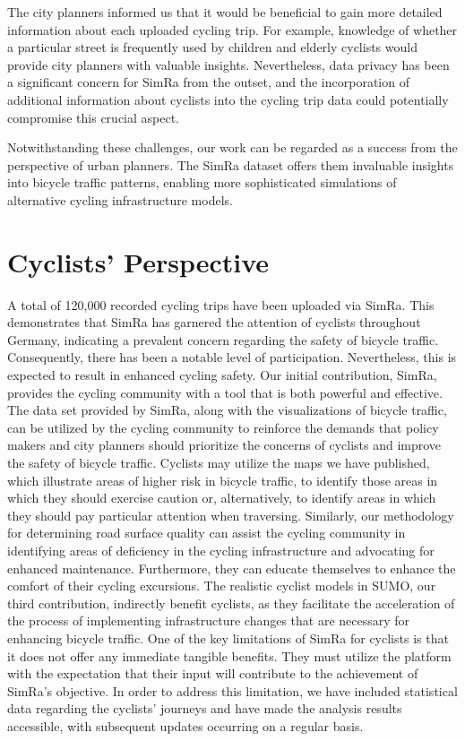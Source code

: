 The city planners informed us that it would be beneficial to gain more detailed information about each uploaded cycling trip.
For example, knowledge of whether a particular street is frequently used by children and elderly cyclists would provide city planners with valuable insights.
Nevertheless, data privacy has been a significant concern for SimRa from the outset, and the incorporation of additional information about cyclists into the cycling trip data could potentially compromise this crucial aspect.

Notwithstanding these challenges, our work can be regarded as a success from the perspective of urban planners. 
The SimRa dataset offers them invaluable insights into bicycle traffic patterns, enabling more sophisticated simulations of alternative cycling infrastructure models. 


\section*{Cyclists' Perspective}
A total of 120,000 recorded cycling trips have been uploaded via SimRa.  
This demonstrates that SimRa has garnered the attention of cyclists throughout Germany, indicating a prevalent concern regarding the safety of bicycle traffic.
Consequently, there has been a notable level of participation.
Nevertheless, this is expected to result in enhanced cycling safety.
Our initial contribution, SimRa, provides the cycling community with a tool that is both powerful and effective.
The data set provided by SimRa, along with the visualizations of bicycle traffic, can be utilized by the cycling community to reinforce the demands that policy makers and city planners should prioritize the concerns of cyclists and improve the safety of bicycle traffic.
Cyclists may utilize the maps we have published, which illustrate areas of higher risk in bicycle traffic, to identify those areas in which they should exercise caution or, alternatively, to identify areas in which they should pay particular attention when traversing.
Similarly, our methodology for determining road surface quality can assist the cycling community in identifying areas of deficiency in the cycling infrastructure and advocating for enhanced maintenance.
Furthermore, they can educate themselves to enhance the comfort of their cycling excursions.
The realistic cyclist models in SUMO, our third contribution, indirectly benefit cyclists, as they facilitate the acceleration of the process of implementing infrastructure changes that are necessary for enhancing bicycle traffic.
One of the key limitations of SimRa for cyclists is that it does not offer any immediate tangible benefits.
They must utilize the platform with the expectation that their input will contribute to the achievement of SimRa's objective.
In order to address this limitation, we have included statistical data regarding the cyclists' journeys and have made the analysis results accessible, with subsequent updates occurring on a regular basis.


